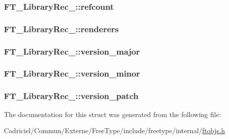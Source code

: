 \hypertarget{struct_f_t___library_rec___aad71b1ecfaea56594fbd21c18e72f15c}{
\subsubsection[{refcount}]{ F\-T\-\_\-\-Library\-Rec\-\_\-\-::refcount}}\label{struct_f_t___library_rec___aad71b1ecfaea56594fbd21c18e72f15c}
\hypertarget{struct_f_t___library_rec___ad9503f71cf4e4d88edfbdda59eb5e43d}{
\subsubsection[{renderers}]{ F\-T\-\_\-\-Library\-Rec\-\_\-\-::renderers}}\label{struct_f_t___library_rec___ad9503f71cf4e4d88edfbdda59eb5e43d}
\hypertarget{struct_f_t___library_rec___a218c30755bac8b58592d70148c938e38}{
\subsubsection[{version\-\_\-major}]{ F\-T\-\_\-\-Library\-Rec\-\_\-\-::version\-\_\-major}}\label{struct_f_t___library_rec___a218c30755bac8b58592d70148c938e38}
\hypertarget{struct_f_t___library_rec___a211d591fbc89d9471715638809865290}{
\subsubsection[{version\-\_\-minor}]{ F\-T\-\_\-\-Library\-Rec\-\_\-\-::version\-\_\-minor}}\label{struct_f_t___library_rec___a211d591fbc89d9471715638809865290}
\hypertarget{struct_f_t___library_rec___a51ab560542e78c5e65e248b5a94f66a1}{
\subsubsection[{version\-\_\-patch}]{ F\-T\-\_\-\-Library\-Rec\-\_\-\-::version\-\_\-patch}}\label{struct_f_t___library_rec___a51ab560542e78c5e65e248b5a94f66a1}


The documentation for this struct was generated from the following file\-:\begin{DoxyCompactItemize}
\item 
Cadriciel/\-Commun/\-Externe/\-Free\-Type/include/freetype/internal/\hyperlink{ftobjs_8h}{ftobjs.\-h}\end{DoxyCompactItemize}
